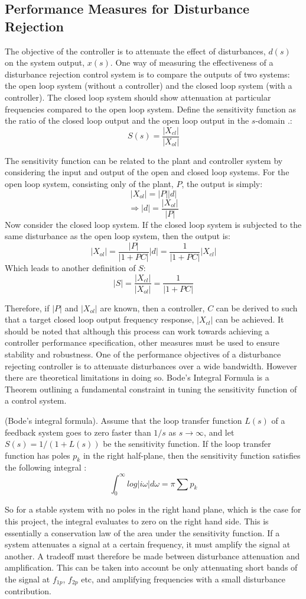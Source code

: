 \subsection{Performance Measures for Disturbance Rejection}
The objective of the controller is to attenuate the effect of disturbances, $d(s)$ on the system output, $x(s)$. One way of measuring the effectiveness of a disturbance rejection control system is to compare the outputs of two systems: the open loop system (without a controller) and the closed loop system (with a controller). The closed loop system should show attenuation at particular frequencies compared to the open loop system. Define the sensitivity function as the ratio of the closed loop output and the open loop output in the $s$-domain \cite{astrom2010feedback}.:
$$S(s) = \frac{|X_{cl}|}{|X_{ol}|}$$  

The sensitivity function can be related to the plant and controller system by considering the input and output of the open and closed loop systems. For the open loop system, consisting only of the plant, $P$, the output is simply:
$$|X_{ol}| = |P||d|$$
$$\Rightarrow |d| = \frac{|X_{ol}|}{|P|}$$
Now consider the closed loop system. If the closed loop system is subjected to the same disturbance as the open loop system, then the output is:
$$|X_{ol}| = \frac{|P|}{|1+PC|}|d| = \frac{1}{|1+PC|}|X_{cl}|$$
Which leads to another definition of $S$:
$$|S| = \frac{|X_{cl}|}{|X_{ol}|} = \frac{1}{|1+PC|}$$

Therefore, if $|P|$ and $|X_{ol}|$ are known, then a controller, $C$ can be derived to such that a target closed loop output frequency response, $|X_{cl}|$ can be achieved. It should be noted that although this process can work towards achieving a controller performance specification, other measures must be used to ensure stability and robustness.
One of the performance objectives of a disturbance rejecting controller is to attenuate disturbances over a wide bandwidth. However there are theoretical limitations in doing so. Bode's Integral Formula is a Theorem outlining a fundamental constraint in tuning the sensitivity function of a control system.

\begin{theorem}
(Bode’s integral formula). Assume that the loop transfer function $L(s)$ of a feedback system goes to zero faster than $1/s$ as $s \rightarrow \infty$, and let $S(s) = 1/(1 + L(s))$ be the sensitivity function. If the loop transfer function has poles $p_k$ in the right half-plane, then the sensitivity function satisfies the following integral \cite{astrom2010feedback}:
$$\int_0^\infty log|i\omega|d\omega = \pi \sum p_k$$
\end{theorem}
So for a stable system with no poles in the right hand plane, which is the case for this project, the integral evaluates to zero on the right hand side. This is essentially a conservation law of the area under the sensitivity function. If a system attenuates a signal at a certain frequency, it must amplify the signal at another. A tradeoff must therefore be made between disturbance attenuation and amplification. This can be taken into account be only attenuating short bands of the signal at $f_{1p}$, $f_{2p}$ etc, and amplifying frequencies with a small disturbance contribution.  


